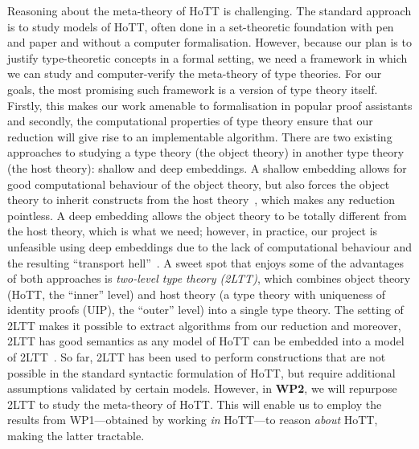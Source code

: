 \documentclass[a4paper,11pt]{article}
\let\oldcite\cite
\renewcommand*\cite[1]{{\protect\NoHyper\oldcite{#1}\protect\endNoHyper}}
\begin{document}
Reasoning about the meta-theory of HoTT is challenging.
The standard approach is to study models of HoTT, often done in a set-theoretic foundation with pen and paper and without a computer formalisation.
However, because our plan is to justify type-theoretic concepts in a formal setting, we need a framework in which we can study and computer-verify the meta-theory of type theories.
%
For our goals, the most promising such framework is a version of %
type theory itself.
%
Firstly, this makes our work amenable to formalisation in popular proof assistants and secondly, the %
computational properties of type theory ensure that our reduction will give rise to an implementable algorithm.
%
There are two existing approaches to studying a type theory (the object theory) in another type theory (the host theory): shallow and deep embeddings. %
%
A shallow embedding allows for good computational behaviour of the object theory, but also forces the object theory to inherit constructs from the host theory~\cite{PfenningElliot1988}, which makes any reduction pointless.
A deep embedding allows the object theory to be totally different from the host theory, which is what we need; however, in practice, our project is unfeasible using deep embeddings due to the lack of computational behaviour and the resulting ``transport hell''~\cite{KapKovKra:embedding}.
A sweet spot that enjoys some of the advantages of both approaches
is \emph{two-level type theory (2LTT)}, which combines object theory (HoTT, the ``inner'' level) and host theory (a type theory with uniqueness of identity proofs (UIP), the ``outer'' level) into a single type theory.
%
The setting of 2LTT makes it possible to extract algorithms from our reduction and moreover, 2LTT has good semantics as any model of HoTT can be embedded into a model of 2LTT~\cite{annenkov_capriotti_kraus_sattler_2023}.
%
So far, 2LTT has been used to perform constructions that are not possible in the standard syntactic formulation of HoTT, but require additional assumptions validated by certain models.
However, in \textbf{WP2}, we will repurpose 2LTT to study the meta-theory of HoTT.
%
This will enable us to employ the results from {WP1}---obtained by working \emph{in} HoTT---to reason \emph{about} HoTT, making the latter tractable.
\end{document}
